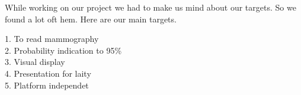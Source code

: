 While working on our project we had to make us mind about our targets. So we found a lot oft hem.  Here are our main targets.

1.	To read mammography\\
2.	Probability indication to 95\%\\
3.	Visual display\\
4.	Presentation for laity\\
5.	Platform independet\\
